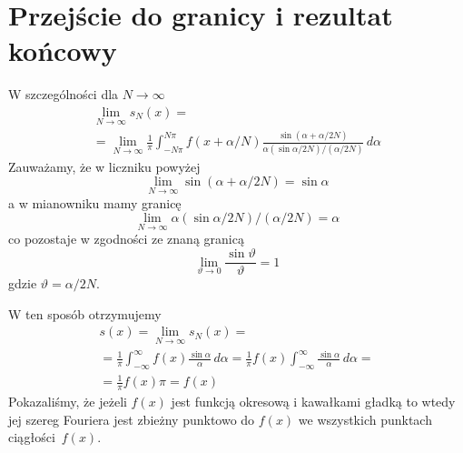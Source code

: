 \section{Przejście do granicy i rezultat końcowy}
\label{final_result}



W szczególności dla $N \rightarrow \infty$
\begin{eqnarray}
\lim_{N \rightarrow \infty} s_{N}(x) =         \\ \nonumber
=
\lim_{N \rightarrow \infty} \frac{1}{\pi} \int_{-N\pi}^{N\pi} f(x+\alpha/N) \frac{\sin(\alpha+\alpha/2N)}{\alpha (\sin \alpha/2N)/(\alpha/2N)} \, d\alpha       
\end{eqnarray}
Zauważamy, że w liczniku powyżej
\begin{equation}
\lim_{N \rightarrow \infty} \sin(\alpha+\alpha/2N) = \sin \alpha
\end{equation}
a w mianowniku mamy granicę
\begin{equation}
\lim_{N \rightarrow \infty} \alpha (\sin \alpha/2N)/(\alpha/2N) = \alpha
\end{equation}
co pozostaje w zgodności ze znaną granicą
\begin{equation}
\lim_{\vartheta \rightarrow 0} \frac{\sin \vartheta}{\vartheta} = 1
\end{equation}
gdzie $\vartheta=\alpha/2N$\@.

W ten sposób otrzymujemy
\begin{eqnarray}
\label{eq:our_result}
s(x)
=
\lim_{N \rightarrow \infty} s_{N}(x) =                                                   \\ \nonumber
=
\frac{1}{\pi} \int_{-\infty}^{\infty} f(x) \frac{\sin \alpha}{\alpha} \, d\alpha
=
\frac{1}{\pi} f(x) \int_{-\infty}^{\infty} \frac{\sin \alpha}{\alpha} \, d\alpha    =    \\ \nonumber
= \frac{1}{\pi} f(x) \pi = f(x)
\end{eqnarray}
Pokazaliśmy, że
jeżeli $f(x)$ jest funkcją okresową i kawałkami gładką to wtedy jej szereg Fouriera
jest zbieżny punktowo do $f(x)$ we wszystkich punktach ciągłości~$f(x)$\@.


